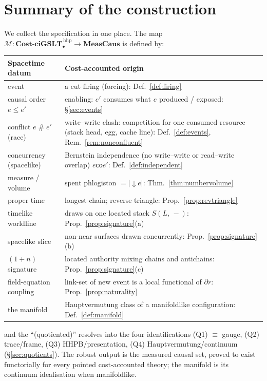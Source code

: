 \documentclass[11pt]{article}
\theoremstyle{definition}
\theoremstyle{plain}
\newcommand{\ciGSLT}{\mathbf{ciGSLT}}
\newcommand{\CostCp}{\mathbf{Cost}\text{-}\ciGSLT_{\bullet}}
\newcommand{\lstk}[2]{S(#1,\, #2)}     %
\newcommand{\Seq}{\equiv}
\newcommand{\foot}{\partial}                       %
\newcommand{\dpast}[1]{{\downarrow}#1}
\newcommand{\MeasCaus}{\mathbf{MeasCaus}}
\newcommand{\Map}{\mathcal{M}}
\newcommand{\co}{\mathbin{\mathsf{co}}}            %
\newcommand{\confl}{\mathrel{\#}}                  %
\theoremstyle{remark}
\begin{document}
\section{Summary of the construction}
\label{sec:summary}

We collect the specification in one place. The map
$\Map : \CostCp^{\,\mathrm{hhp}} \to \MeasCaus$ is defined by:

\begin{center}
\renewcommand{\arraystretch}{1.35}
\begin{tabular}{@{}>{\raggedright\arraybackslash}p{}>{\raggedright\arraybackslash}p{}@{}}
\toprule
\textbf{Spacetime datum} & \textbf{Cost-accounted origin} \\
\midrule
event & a cut firing (forcing): Def.~\ref{def:firing} \\
causal order $e \le e'$ & enabling: $e'$ consumes what $e$ produced /
exposed: \S\ref{sec:events} \\
conflict $e \confl e'$ (race) & write--write clash: competition for one
consumed resource (stack head, egg, cache line):
Def.~\ref{def:events}, Rem.~\ref{rem:nonconfluent} \\
concurrency (spacelike) & Bernstein independence (no write--write or
read--write overlap) $e \co e'$: Def.~\ref{def:independent} \\
measure / volume & spent phlogiston $= |{\dpast e}|$:
Thm.~\ref{thm:numbervolume} \\
proper time & longest chain; reverse triangle:
Prop.~\ref{prop:revtriangle} \\
timelike worldline & draws on one located stack $\lstk{L}{-}$:
Prop.~\ref{prop:signature}(a) \\
spacelike slice & non-near surfaces drawn concurrently:
Prop.~\ref{prop:signature}(b) \\
$(1{+}n)$ signature & located authority mixing chains and antichains:
Prop.~\ref{prop:signature}(c) \\
field-equation coupling & link-set of new event is a local functional of
$\foot r$: Prop.~\ref{prop:naturality} \\
the manifold & Hauptvermutung class of a manifoldlike configuration:
Def.~\ref{def:manifold} \\
\bottomrule
\end{tabular}
\end{center}

\noindent
and the ``(quotiented)'' resolves into the four identifications
\textup{(Q1)} $\Seq$ gauge, \textup{(Q2)} trace/frame, \textup{(Q3)}
HHPB/presentation, \textup{(Q4)} Hauptvermutung/continuum
(\S\ref{sec:quotients}). The robust output is the measured causal set,
proved to exist functorially for every pointed cost-accounted theory; the
manifold is its continuum idealisation when manifoldlike.
\end{document}
